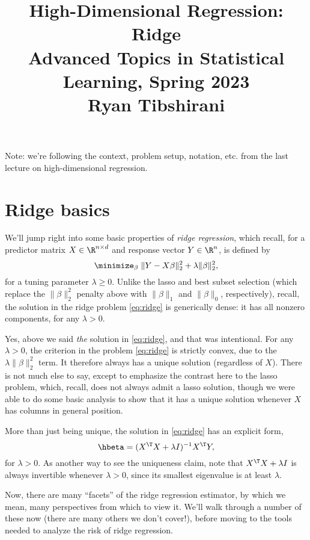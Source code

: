 \documentclass{article}
\title{High-Dimensional Regression: Ridge \\ \smallskip
\large Advanced Topics in Statistical Learning, Spring 2023 \\ \smallskip
Ryan Tibshirani}
\date{}
\begin{document}
\maketitle
\RaggedRight
\vspace{-50pt}

Note: we're following the context, problem setup, notation, etc. from the last
lecture on high-dimensional regression.

\section{Ridge basics}

We'll jump right into some basic properties of \emph{ridge regression}, which
recall, for a predictor matrix $X \in \R^{n \times d}$ and response vector $Y
\in \R^n$, is defined by
\begin{equation}
\label{eq:ridge}
\minimize_\beta \; \|Y - X\beta\|_2^2 + \lambda \|\beta\|_2^2, 
\end{equation}
for a tuning parameter $\lambda \geq 0$. Unlike the lasso and best subset
selection (which replace the $\|\beta\|_2^2$ penalty above with $\|\beta\|_1$
and $\|\beta\|_0$, respectively), recall, the solution in the ridge problem
\eqref{eq:ridge} is generically dense: it has all nonzero components, for any
$\lambda > 0$.  

Yes, above we said \emph{the} solution in \eqref{eq:ridge}, and that was 
intentional. For any $\lambda > 0$, the criterion in the problem
\eqref{eq:ridge} is strictly convex, due to the $\lambda \|\beta\|_2^2$ term. It
therefore always has a unique solution (regardless of $X$). There is not much
else to say, except to emphasize the contrast here to the lasso problem, which,
recall, does not always admit a lasso solution, though we were able to do some
basic analysis to show that it has a unique solution whenever $X$ has columns in
general position.      

More than just being unique, the solution in \eqref{eq:ridge} has an explicit
form,
\begin{equation}
\label{eq:ridge_sol}
\hbeta = (X^\T X + \lambda I)^{-1} X^\T Y,
\end{equation}
for $\lambda > 0$. As another way to see the uniqueness claim, note that $X^\T X
+ \lambda I$ is always invertible whenever $\lambda > 0$, since its smallest
eigenvalue is at least $\lambda$. 

Now, there are many ``facets'' of the ridge regression estimator, by which we
mean, many perspectives from which to view it. We'll walk through a number of
these now (there are many others we don't cover!), before moving to the tools
needed to analyze the risk of ridge regression.   
\end{document}
